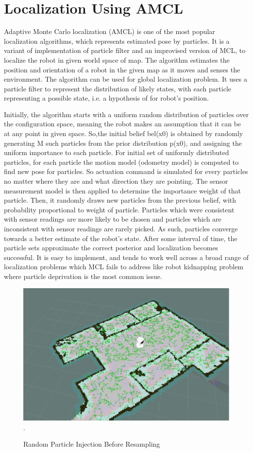 \documentclass[journal,twoside]{IEEEtran}
\begin{document}
\section{Localization Using AMCL}
\noindent Adaptive Monte Carlo localization (AMCL) is one of the most popular localization algorithms, which represents estimated pose by particles. It is a variant of implementation of particle filter and an improvised version of MCL, to localize the robot in given world space of map. The algorithm estimates the position and orientation of a robot in the given map as it moves and senses the environment. The algorithm can be used for global localization problem. It uses a particle filter to represent the distribution of likely states, with each particle representing a possible state, i.e. a hypothesis of for robot’s position. 
\par\noindent Initially, the algorithm starts with a uniform random distribution of particles over the configuration space, meaning the robot makes an assumption that it can be at any point in given space. So,the initial belief bel(x0) is obtained by randomly
generating M such particles from the prior distribution p(x0), and assigning the uniform importance to each particle. For initial set of uniformly distributed particles, for each particle the motion model (odometry model) is computed to find new pose for particles. So actuation command is simulated for every particles no matter where they are and what direction they are pointing. The sensor measurement model is then applied to determine the importance weight of that particle. Then, it randomly draws new particles from the previous belief, with probability proportional to weight of particle. Particles which were consistent with sensor readings are more likely to be chosen and particles which are inconsistent with
sensor readings are rarely picked. As such, particles converge towards a better estimate of the robot’s state. After some interval of time, the particle sets approximate the correct posterior and localization becomes successful. It is easy to implement, and tends to work well across a broad range of localization problems which MCL fails to address like robot kidnapping problem where particle deprivation is the most common issue.
\begin{figure}[h]
\centering
\includegraphics[scale=.27]{3.jpg}
\DeclareGraphicsExtensions.
\caption{Random Particle Injection Before Resampling}
\end{figure}
\end{document}
